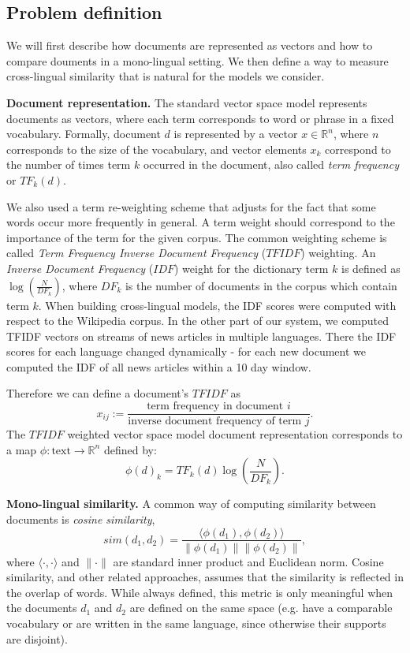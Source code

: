 \documentclass[twoside,11pt]{article}
\newcommand{\RR}{\mathbb{R}}
\begin{document}
\subsection{Problem definition}\label{sec:tfidf}
We will first describe how documents are represented as vectors and how to compare douments in a mono-lingual setting. We then define a way to measure cross-lingual similarity that is natural for the models we consider.

\noindent\textbf{Document representation.}
The standard vector space model \cite{Salton88term-weightingapproaches} represents documents as vectors, where each term corresponds to word or phrase in a fixed vocabulary. Formally, document $d$ is represented by a vector $x \in \RR^n$, where $n$ corresponds to the size of the vocabulary, and vector elements $x_k$ correspond to the number of times term $k$ occurred in the document, also called \emph{term frequency} or $TF_k(d)$.

We also used a term re-weighting scheme that adjusts for the fact that some words occur more frequently in general. A term weight should correspond to the importance of the term for the given corpus. The common weighting scheme is called \emph{Term Frequency Inverse Document Frequency} ($TFIDF$) weighting. An \emph{Inverse Document Frequency} ($IDF$) weight for the dictionary term $k$ is defined as $\log\left( \frac{N}{DF_k} \right)$, where $DF_k$ is the number of documents in the corpus which contain term $k$. 
When building cross-lingual models, the IDF scores were computed with respect to the Wikipedia corpus. In the other part of our system, we computed TFIDF vectors on streams of news articles in multiple languages. There the IDF scores for each language changed dynamically - for each new document we computed the IDF of all news articles within a 10 day window.

Therefore we can define a document's $TFIDF$ as
$$ x_{ij}  := \frac{\mbox{term frequency in document } i}{\mbox{inverse document frequency of term } j}.$$
The $TFIDF$ weighted vector space model document representation corresponds to a map $\phi : \text{text} \rightarrow \RR^n$ defined by:
$$\phi(d)_k = {TF}_k(d) \log\left( \frac{N}{{DF}_k}\right).$$

\noindent\textbf {Mono-lingual similarity.}
A common way of computing similarity between documents is \emph{cosine similarity},
$$sim(d_1, d_2) = \frac{\langle \phi(d_1), \phi(d_2)\rangle}{\|\phi(d_1)\| \|\phi(d_2)\|},$$
where $\langle \cdot,\cdot \rangle$ and $\|\cdot\|$ are standard inner product and Euclidean norm. Cosine similarity, and other related approaches, assumes that the similarity is reflected in the overlap of words. While always defined, this metric is only meaningful when the documents $d_1$ and $d_2$ are defined on the same space (e.g. have a comparable vocabulary or are written in the same language, since otherwise their supports are disjoint).
\end{document}
